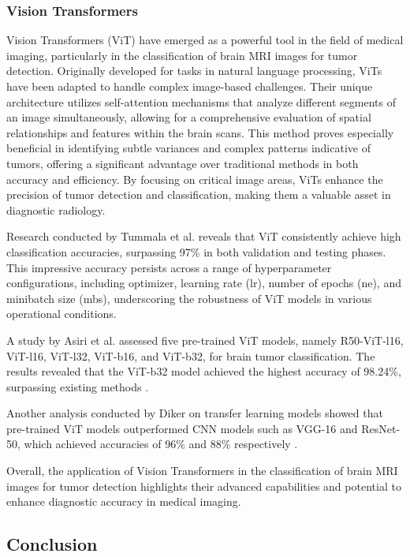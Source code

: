 \subsubsection{Vision Transformers}

Vision Transformers (ViT) have emerged as a powerful tool in the field of medical imaging, particularly in the classification of brain MRI images for tumor detection. Originally developed for tasks in natural language processing, ViTs have been adapted to handle complex image-based challenges. Their unique architecture utilizes self-attention mechanisms that analyze different segments of an image simultaneously, allowing for a comprehensive evaluation of spatial relationships and features within the brain scans. This method proves especially beneficial in identifying subtle variances and complex patterns indicative of tumors, offering a significant advantage over traditional methods in both accuracy and efficiency. By focusing on critical image areas, ViTs enhance the precision of tumor detection and classification, making them a valuable asset in diagnostic radiology.

Research conducted by Tummala et al. \cite{Tummala2022} reveals that ViT consistently achieve high classification accuracies, surpassing 97\% in both validation and testing phases. This impressive accuracy persists across a range of hyperparameter configurations, including optimizer, learning rate (lr), number of epochs (ne), and minibatch size (mbs), underscoring the robustness of ViT models in various operational conditions.

A study by Asiri et al. assessed five pre-trained ViT models, namely R50-ViT-l16, ViT-l16, ViT-l32, ViT-b16, and ViT-b32, for brain tumor classification. The results revealed that the ViT-b32 model achieved the highest accuracy of 98.24\%, surpassing existing methods \cite{Asiri2023Advancing}. 

Another analysis conducted by Diker on transfer learning models showed that pre-trained ViT models outperformed CNN models such as VGG-16 and ResNet-50, which achieved accuracies of 96\% and 88\% respectively \cite{Diker2021A}.

Overall, the application of Vision Transformers in the classification of brain MRI images for tumor detection highlights their advanced capabilities and potential to enhance diagnostic accuracy in medical imaging.


\subsection{Conclusion}

